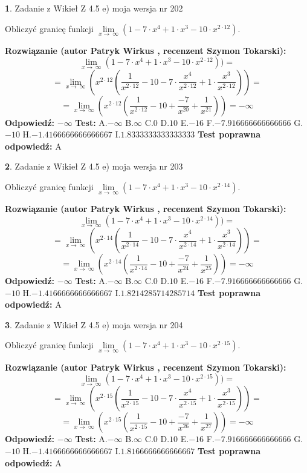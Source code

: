 \documentclass[12pt, a4paper]{article}
\theoremstyle{definition} %
\newtheorem{zad}{}
\newcommand{\zadStart}[1]{\begin{zad}#1\newline}
\newcommand{\zadStop}{\end{zad}}
\newcommand{\rozwStart}[2]{\noindent \textbf{Rozwiązanie (autor #1 , recenzent #2): }\newline}
\newcommand{\rozwStop}{\newline}
\newcommand{\odpStart}{\noindent \textbf{Odpowiedź:}\newline}
\newcommand{\odpStop}{\newline}
\newcommand{\testStart}{\noindent \textbf{Test:}\newline}
\newcommand{\testStop}{\newline}
\newcommand{\kluczStart}{\noindent \textbf{Test poprawna odpowiedź:}\newline}
\newcommand{\kluczStop}{\newline}
\begin{document}
\zadStart{Zadanie z Wikieł Z 4.5 e) moja wersja nr 202}


Obliczyć granicę funkcji  $\lim\limits_{x\to\ \infty}(1 - 7 \cdot x^{4}+1 \cdot x^{3}- 10 \cdot x^{2\cdot12})$.
\zadStop
\rozwStart{Patryk Wirkus}{Szymon Tokarski}
$$\lim\limits_{x\to\ \infty}(1 - 7 \cdot x^{4}+1 \cdot x^{3}- 10 \cdot x^{2\cdot12}))=$$
$$=\lim\limits_{x\to\ \infty}(x^{2\cdot12}(\frac{1}{x^{2\cdot12}}-10 -7 \cdot \frac{x^{4}}{x^{2\cdot12}}+1 \cdot \frac{x^{3}}{x^{2\cdot12}}))=$$
$$=\lim\limits_{x\to\ \infty}(x^{2\cdot12}(\frac{1}{x^{2\cdot12}}-10 + \frac{-7}{x^{20}}+ \frac{1}{x^{21}}))=-\infty$$
\rozwStop
\odpStart
$-\infty$
\odpStop
\testStart
A.$-\infty$ B.$\infty$ C.$0$ D.$10$ E.$-16$
F.$-7.916666666666666$ G.$-10$
H.$-1.4166666666666667$
I.$1.8333333333333333$
\testStop
\kluczStart
A
\kluczStop



\zadStart{Zadanie z Wikieł Z 4.5 e) moja wersja nr 203}


Obliczyć granicę funkcji  $\lim\limits_{x\to\ \infty}(1 - 7 \cdot x^{4}+1 \cdot x^{3}- 10 \cdot x^{2\cdot14})$.
\zadStop
\rozwStart{Patryk Wirkus}{Szymon Tokarski}
$$\lim\limits_{x\to\ \infty}(1 - 7 \cdot x^{4}+1 \cdot x^{3}- 10 \cdot x^{2\cdot14}))=$$
$$=\lim\limits_{x\to\ \infty}(x^{2\cdot14}(\frac{1}{x^{2\cdot14}}-10 -7 \cdot \frac{x^{4}}{x^{2\cdot14}}+1 \cdot \frac{x^{3}}{x^{2\cdot14}}))=$$
$$=\lim\limits_{x\to\ \infty}(x^{2\cdot14}(\frac{1}{x^{2\cdot14}}-10 + \frac{-7}{x^{24}}+ \frac{1}{x^{25}}))=-\infty$$
\rozwStop
\odpStart
$-\infty$
\odpStop
\testStart
A.$-\infty$ B.$\infty$ C.$0$ D.$10$ E.$-16$
F.$-7.916666666666666$ G.$-10$
H.$-1.4166666666666667$
I.$1.8214285714285714$
\testStop
\kluczStart
A
\kluczStop



\zadStart{Zadanie z Wikieł Z 4.5 e) moja wersja nr 204}


Obliczyć granicę funkcji  $\lim\limits_{x\to\ \infty}(1 - 7 \cdot x^{4}+1 \cdot x^{3}- 10 \cdot x^{2\cdot15})$.
\zadStop
\rozwStart{Patryk Wirkus}{Szymon Tokarski}
$$\lim\limits_{x\to\ \infty}(1 - 7 \cdot x^{4}+1 \cdot x^{3}- 10 \cdot x^{2\cdot15}))=$$
$$=\lim\limits_{x\to\ \infty}(x^{2\cdot15}(\frac{1}{x^{2\cdot15}}-10 -7 \cdot \frac{x^{4}}{x^{2\cdot15}}+1 \cdot \frac{x^{3}}{x^{2\cdot15}}))=$$
$$=\lim\limits_{x\to\ \infty}(x^{2\cdot15}(\frac{1}{x^{2\cdot15}}-10 + \frac{-7}{x^{26}}+ \frac{1}{x^{27}}))=-\infty$$
\rozwStop
\odpStart
$-\infty$
\odpStop
\testStart
A.$-\infty$ B.$\infty$ C.$0$ D.$10$ E.$-16$
F.$-7.916666666666666$ G.$-10$
H.$-1.4166666666666667$
I.$1.8166666666666667$
\testStop
\kluczStart
A
\kluczStop
\end{document}
